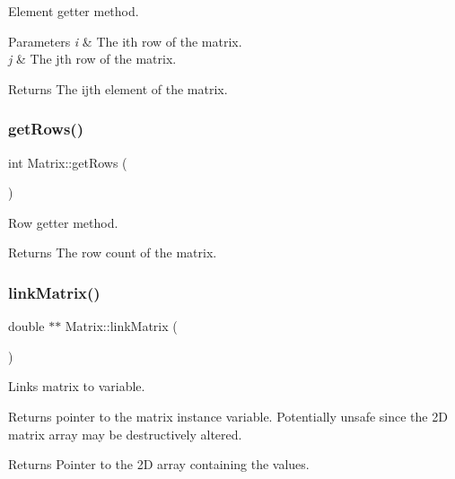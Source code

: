 Element getter method. 


\begin{DoxyParams}{Parameters}
{\em i} & The ith row of the matrix. \\
\hline
{\em j} & The jth row of the matrix. \\
\hline
\end{DoxyParams}
\begin{DoxyReturn}{Returns}
The ijth element of the matrix. 
\end{DoxyReturn}
\mbox{\label{classMatrix_a756736b31a372037de52b9ed83bc06b3}} 
\subsubsection{\texorpdfstring{get\+Rows()}{getRows()}}
{\footnotesize\ttfamily int Matrix\+::get\+Rows (\begin{DoxyParamCaption}{ }\end{DoxyParamCaption})}



Row getter method. 

\begin{DoxyReturn}{Returns}
The row count of the matrix. 
\end{DoxyReturn}
\mbox{\label{classMatrix_a0d0a0bd2c4b2de17f34e9b233b6b03f7}} 
\subsubsection{\texorpdfstring{link\+Matrix()}{linkMatrix()}}
{\footnotesize\ttfamily double $\ast$$\ast$ Matrix\+::link\+Matrix (\begin{DoxyParamCaption}{ }\end{DoxyParamCaption})}



Links matrix to variable. 

Returns pointer to the matrix instance variable. Potentially unsafe since the 2D matrix array may be destructively altered.

\begin{DoxyReturn}{Returns}
Pointer to the 2D array containing the values. 
\end{DoxyReturn}
\mbox{\label{classMatrix_a9a98da6cf9820fa14d6077d3ef0b83d7}} 
